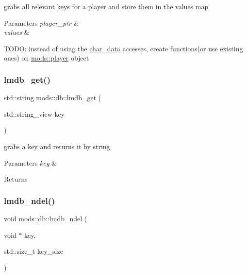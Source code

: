 grabs all relevant keys for a player and store them in the values map 


\begin{DoxyParams}{Parameters}
{\em player\+\_\+ptr} & \\
\hline
{\em values} & \\
\hline
\end{DoxyParams}
T\+O\+DO\+: instead of using the \hyperlink{structchar__data}{char\+\_\+data} accesses, create functions(or use existing ones) on \hyperlink{classmods_1_1player}{mods\+::player} object \mbox{\label{namespacemods_1_1db_a76eb530e6b65cbed6c0462ccd14cdc94}} 
\subsubsection{\texorpdfstring{lmdb\+\_\+get()}{lmdb\_get()}}
{\footnotesize\ttfamily std\+::string mods\+::db\+::lmdb\+\_\+get (\begin{DoxyParamCaption}\item[{std\+::string\+\_\+view}]{key }\end{DoxyParamCaption})}



grabs a key and returns it by string 


\begin{DoxyParams}{Parameters}
{\em key} & \\
\hline
\end{DoxyParams}
\begin{DoxyReturn}{Returns}

\end{DoxyReturn}
\mbox{\label{namespacemods_1_1db_af13cbeaf36d1892265aca37289d5c7cc}} 
\subsubsection{\texorpdfstring{lmdb\+\_\+ndel()}{lmdb\_ndel()}}
{\footnotesize\ttfamily void mods\+::db\+::lmdb\+\_\+ndel (\begin{DoxyParamCaption}\item[{void $\ast$}]{key,  }\item[{std\+::size\+\_\+t}]{key\+\_\+size }\end{DoxyParamCaption})}




